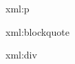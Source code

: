 \startxmlsetups xml:p
  \par
\stopxmlsetups

\startxmlsetups xml:blockquote
\stopxmlsetups

\startxmlsetups xml:div
  \stop
\stopxmlsetups

